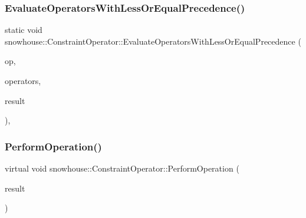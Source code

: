 \mbox{\label{structsnowhouse_1_1ConstraintOperator_aafb0a6fce0186a0afc4854ffe69b6a23}} 
\subsubsection{\texorpdfstring{EvaluateOperatorsWithLessOrEqualPrecedence()}{EvaluateOperatorsWithLessOrEqualPrecedence()}}
{\footnotesize\ttfamily static void snowhouse\+::\+Constraint\+Operator\+::\+Evaluate\+Operators\+With\+Less\+Or\+Equal\+Precedence (\begin{DoxyParamCaption}\item[{const \mbox{\hyperlink{structsnowhouse_1_1ConstraintOperator}{Constraint\+Operator}} \&}]{op,  }\item[{\mbox{\hyperlink{namespacesnowhouse_adcb10e215e6a4bbcb35722a9c7270fc6}{Operator\+Stack}} \&}]{operators,  }\item[{\mbox{\hyperlink{namespacesnowhouse_a719169b1315a13161c15f25e600a8f51}{Result\+Stack}} \&}]{result }\end{DoxyParamCaption})\hspace{0.3cm}{\ttfamily [inline]}, {\ttfamily [static]}}

\mbox{\label{structsnowhouse_1_1ConstraintOperator_a885882868139127eb8ff3f3ec6a97737}} 
\subsubsection{\texorpdfstring{PerformOperation()}{PerformOperation()}}
{\footnotesize\ttfamily virtual void snowhouse\+::\+Constraint\+Operator\+::\+Perform\+Operation (\begin{DoxyParamCaption}\item[{\mbox{\hyperlink{namespacesnowhouse_a719169b1315a13161c15f25e600a8f51}{Result\+Stack}} \&}]{result }\end{DoxyParamCaption})\hspace{0.3cm}{\ttfamily [pure virtual]}}



